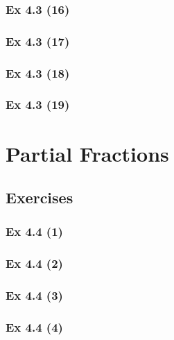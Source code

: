 \subsubsection{Ex 4.3 (16)}\label{sec:Ex_4.3.16}

\subsubsection{Ex 4.3 (17)}\label{sec:Ex_4.3.17}

\subsubsection{Ex 4.3 (18)}\label{sec:Ex_4.3.18}

\subsubsection{Ex 4.3 (19)}\label{sec:Ex_4.3.19}

\newpage		%

\section{Partial Fractions}\label{sec:4.4}
\subsection{Exercises}\label{sec:4.4_Exercises}

\subsubsection{Ex 4.4 (1)}\label{sec:Ex_4.4.1}

\subsubsection{Ex 4.4 (2)}\label{sec:Ex_4.4.2}

\subsubsection{Ex 4.4 (3)}\label{sec:Ex_4.4.3}

\subsubsection{Ex 4.4 (4)}\label{sec:Ex_4.4.4}

